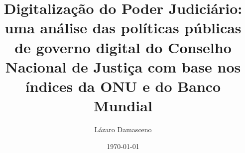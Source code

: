 \documentclass[12pt, a4paper]{report}
\begin{document}
\title{Digitalização do Poder Judiciário: uma análise das políticas públicas de governo digital do Conselho Nacional de Justiça com base nos índices da ONU e do Banco Mundial} 

\author{Lázaro Damasceno}
\date{\today}
\maketitle

\listoffigures
\listoftables
\tableofcontents








\end{document}
